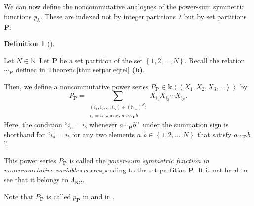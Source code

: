 \documentclass[numbers=enddot,12pt,final,onecolumn,notitlepage]{scrartcl}%
\theoremstyle{definition}
\newtheorem{defi}[theo]{Definition}
\newenvironment{definition}[1][]
{\begin{defi}[#1]\begin{leftbar}}
{\end{leftbar}\end{defi}}
\let\sumnonlimits\sum
\renewcommand{\sum}{\sumnonlimits\limits}
\begin{document}
We can now define the noncommutative analogues of the power-sum symmetric
functions $p_{\lambda}$. These are indexed not by integer partitions $\lambda$
but by set partitions $\mathbf{P}$:

\begin{definition}
Let $N\in\mathbb{N}$. Let $\mathbf{P}$ be a set partition of the set $\left\{
1,2,\ldots,N\right\}  $. Recall the relation $\sim_{\mathbf{P}}$ defined in
Theorem \ref{thm.setpar.eqrel} \textbf{(b)}.

Then, we define a noncommutative power series $P_{\mathbf{P}}\in
\mathbf{k}\left\langle \left\langle X_{1},X_{2},X_{3},\ldots\right\rangle
\right\rangle $ by%
\[
P_{\mathbf{P}}=\sum_{\substack{\left(  i_{1},i_{2},\ldots,i_{N}\right)
\in\left(  \mathbb{N}_{+}\right)  ^{N};\\i_{a}=i_{b}\text{ whenever }%
a\sim_{\mathbf{P}}b}}X_{i_{1}}X_{i_{2}}\cdots X_{i_{N}}.
\]
Here, the condition \textquotedblleft$i_{a}=i_{b}$ whenever $a\sim
_{\mathbf{P}}b$\textquotedblright\ under the summation sign is shorthand for
\textquotedblleft$i_{a}=i_{b}$ for any two elements $a,b\in\left\{
1,2,\ldots,N\right\}  $ that satisfy $a\sim_{\mathbf{P}}b$\textquotedblright.

This power series $P_{\mathbf{P}}$ is called the \emph{power-sum symmetric
function in noncommutative variables} corresponding to the set partition
$\mathbf{P}$. It is not hard to see that it belongs to $\Lambda
_{\operatorname*{NC}}$.
\end{definition}

Note that $P_{\mathbf{P}}$ is called $p_{\mathbf{P}}$ in \cite[\S 2]{GebSag01}
and in \cite{RosSag04}.
\end{document}
